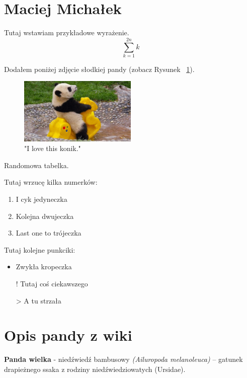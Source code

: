 \section{Maciej Michałek}
\label{sec:macmichalek}

Tutaj wstawiam przykładowe wyrażenie.
\begin{equation}
    \sum_{k=1}^{2n} k
    \label{fig:wyrazeniemat}
\end{equation}

\vspace{2em}
Dodałem poniżej zdjęcie słodkiej pandy (zobacz Rysunek ~\ref{fig:funnypanda}).

\begin{figure}[htbp]
    \centering
    \includegraphics[width=0.5\textwidth]{pictures/funny panda.jpg} 
    \caption{"I love this konik."}
    \label{fig:funnypanda}
\end{figure}

\vspace{2em}
Randomowa tabelka.



\vspace{2em}
Tutaj wrzucę kilka numerków:
\begin{enumerate}
  \item I cyk jedyneczka
  \item Kolejna dwujeczka 
  \item Last one to trójeczka
\end{enumerate}

\vspace{1em}
Tutaj kolejne punkciki:
\begin{itemize}
  \item Zwykła kropeczka
  \item[!] Tutaj coś ciekawszego
  \item[>] A tu strzała
\end{itemize}

\section*{Opis pandy z wiki}
{\bf Panda wielka} - niedźwiedź bambusowy {\it (Ailuropoda melanoleuca)} – gatunek drapieżnego ssaka z rodziny niedźwiedziowatych (Ursidae).
